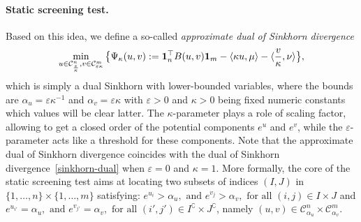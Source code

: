 \paragraph{Static screening test.} Based on this idea, we define a so-called \emph{approximate dual of Sinkhorn divergence} 
\begin{equation} 
\label{screen-sinkhorn}
\min_{u \in \mathcal{C}^n_{\frac \varepsilon \kappa}, v\in \mathcal{C}^m_{\varepsilon\kappa}} \big\{\Psi_{\kappa}(u,v):= \mathbf{1}_n^\top B(u,v)\mathbf{1}_m - \langle \kappa u, \mu \rangle - \langle \frac v\kappa, \nu \rangle \big\},
\end{equation}
which is simply a dual Sinkhorn with lower-bounded variables, where the bounds
are $\alpha_u = \varepsilon \kappa^{-1}$ and $\alpha_v = \varepsilon \kappa$ with $\varepsilon > 0$ and $\kappa > 0$ being fixed numeric constants which values will be
clear latter. 
The $\kappa$-parameter plays a role of scaling factor, allowing to get a closed order of the potential components $e^u$ and $e^v$, while the $\varepsilon$-parameter acts like a threshold for these components.
Note that the approximate dual of Sinkhorn divergence coincides with the dual of Sinkhorn divergence~\eqref{sinkhorn-dual} when $\varepsilon=0$ and $\kappa=1$.
  More formally, 
 the core of the static screening test aims at locating two subsets of indices $(I, J)$ in $\{1, \ldots, n\}\times\{1, \ldots, m\}$ satisfying: $e^{u_i} > \alpha_u, \text{ and } e^{v_j} > \alpha_v, \text{ for all } (i,j) \in I \times J$ and 
$e^{u_{i'}} = \alpha_u, \text{ and } e^{v_{j'}} = \alpha_v, \text{ for all } (i',j') \in I^\complement \times J^\complement$, namely $(u,v) \in \mathcal{C}^n_{\alpha_u}\times \mathcal{C}^m_{\alpha_v}$. 
 


